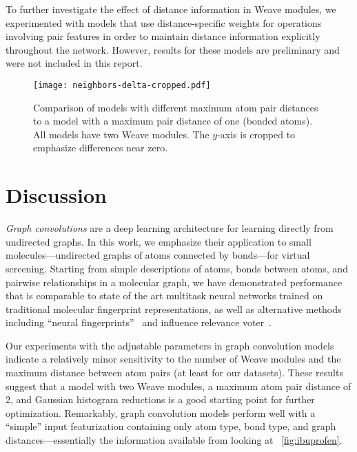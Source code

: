 To further investigate the effect of distance information in Weave modules, we
experimented with models that use distance-specific weights for
operations involving pair features in order to maintain distance information
explicitly throughout the network. However, results for these models are preliminary and
were not included in this report.

\begin{figure}[tb]
\centering
  \texttt{[image: neighbors-delta-cropped.pdf]}
  \caption{
    Comparison of models with different maximum atom pair distances to a model
    with a maximum pair distance of one (bonded atoms). All models have two
    Weave modules. The $y$-axis is cropped to emphasize differences near zero.
  }
  \label{fig:neighbors_delta}
\end{figure}

\section{Discussion}\label{sec:discussion}

\emph{Graph convolutions} are a deep learning architecture for learning directly
from undirected graphs. In this work, we emphasize their application to small
molecules---undirected graphs of atoms connected by bonds---for virtual
screening. Starting from simple descriptions of atoms, bonds between atoms, and
pairwise relationships in a molecular graph, we have demonstrated performance
that is comparable to state of the art multitask neural networks trained on
traditional molecular fingerprint representations, as well as alternative
methods including ``neural fingerprints''~\citep{duvenaud2015convolutional} and
influence relevance voter~\citep{swamidass2009influence}.

Our experiments with the adjustable parameters in graph convolution models
indicate a relatively minor sensitivity to the number of Weave modules and the
maximum distance between atom pairs (at least for our datasets). These results suggest that a
model with two Weave modules, a maximum atom pair distance of 2, and
Gaussian histogram reductions is a good starting point for further optimization.
Remarkably, graph
convolution models perform well with a ``simple'' input featurization containing
only atom type, bond type, and graph distances---essentially the information
available from looking at \figurename~\ref{fig:ibuprofen}.

